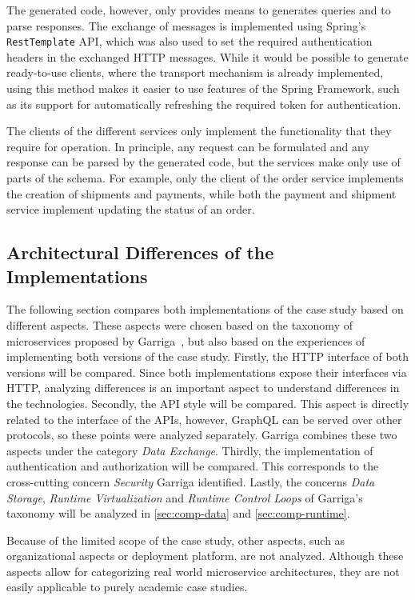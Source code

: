 The generated code, however, only provides means to generates queries and to parse responses.
The exchange of messages is implemented using Spring's \texttt{RestTemplate} \ac{API}, which was also used to set the required authentication headers in the exchanged \ac{HTTP} messages.
While it would be possible to generate ready-to-use clients, where the transport mechanism is already implemented, using this method makes it easier to use features of the Spring Framework, such as its support for automatically refreshing the required token for authentication.

The clients of the different services only implement the functionality that they require for operation.
In principle, any request can be formulated and any response can be parsed by the generated code, but the services make only use of parts of the schema.
For example, only the client of the order service implements the creation of shipments and payments, while both the payment and shipment service implement updating the status of an order.

\subsection{Architectural Differences of the Implementations}\label{sec:cs-comp}

The following section compares both implementations of the case study based on different aspects.
These aspects were chosen based on the taxonomy of microservices proposed by Garriga~\cite{Garriga2017}, but also based on the experiences of implementing both versions of the case study.
Firstly, the \ac{HTTP} interface of both versions will be compared.
Since both implementations expose their interfaces via \ac{HTTP}, analyzing differences is an important aspect to understand differences in the technologies.
Secondly, the \ac{API} style will be compared.
This aspect is directly related to the interface of the \acp{API}, however, GraphQL can be served over other protocols, so these points were analyzed separately.
Garriga combines these two aspects under the category \textit{Data Exchange}.
Thirdly, the implementation of authentication and authorization will be compared.
This corresponds to the cross-cutting concern \textit{Security} Garriga identified.
Lastly, the concerns \textit{Data Storage}, \textit{Runtime Virtualization} and \textit{Runtime Control Loops} of Garriga's taxonomy will be analyzed in \autoref{sec:comp-data} and \autoref{sec:comp-runtime}.

Because of the limited scope of the case study, other aspects, such as organizational aspects or deployment platform, are not analyzed.
Although these aspects allow for categorizing real world microservice architectures, they are not easily applicable to purely academic case studies.

